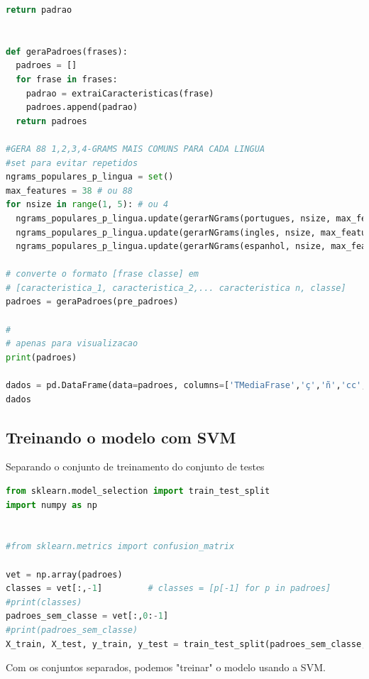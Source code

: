\begin{lstlisting}[language=Python, style=input]
  return padrao


def geraPadroes(frases):
  padroes = []
  for frase in frases:
    padrao = extraiCaracteristicas(frase)
    padroes.append(padrao)
  return padroes

#GERA 88 1,2,3,4-GRAMS MAIS COMUNS PARA CADA LINGUA
#set para evitar repetidos
ngrams_populares_p_lingua = set()
max_features = 38 # ou 88
for nsize in range(1, 5): # ou 4
  ngrams_populares_p_lingua.update(gerarNGrams(portugues, nsize, max_features))
  ngrams_populares_p_lingua.update(gerarNGrams(ingles, nsize, max_features))
  ngrams_populares_p_lingua.update(gerarNGrams(espanhol, nsize, max_features))

# converte o formato [frase classe] em
# [caracteristica_1, caracteristica_2,... caracteristica n, classe]
padroes = geraPadroes(pre_padroes)

#
# apenas para visualizacao
print(padroes)

dados = pd.DataFrame(data=padroes, columns=['TMediaFrase','ç','ñ','cc','oo','ll','ss','mm','nn','rr','ee', 'à', 'ón', 'ã', 'ay', 'yo', *ngrams_populares_p_lingua, 'Lingua'])
dados
\end{lstlisting}


\subsection*{\textbf{Treinando o modelo com SVM}}

Separando o conjunto de treinamento do conjunto de testes


\begin{lstlisting}[language=Python, style=input]
from sklearn.model_selection import train_test_split
import numpy as np


#from sklearn.metrics import confusion_matrix

vet = np.array(padroes)
classes = vet[:,-1]         # classes = [p[-1] for p in padroes]
#print(classes)
padroes_sem_classe = vet[:,0:-1]
#print(padroes_sem_classe)
X_train, X_test, y_train, y_test = train_test_split(padroes_sem_classe, classes, test_size=0.20, stratify=classes)
\end{lstlisting}

Com os conjuntos separados, podemos "treinar" o modelo usando a SVM.

